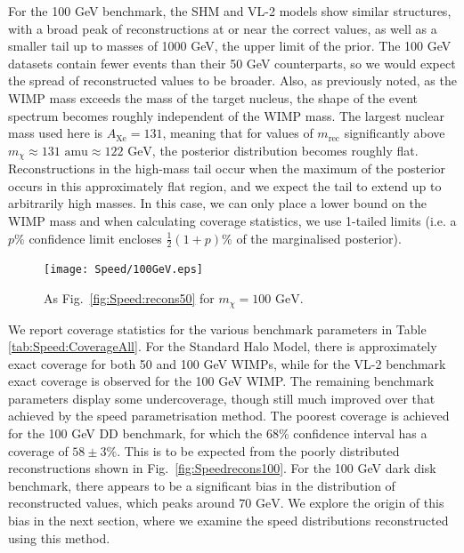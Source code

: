 For the 100 GeV benchmark, the SHM and VL-2 models show similar structures, with a broad peak of reconstructions at or near the correct values, as well as a smaller tail up to masses of 1000 GeV, the upper limit of the prior. The 100 GeV datasets contain fewer events than their 50 GeV counterparts, so we would expect the spread of reconstructed values to be broader. Also, as previously noted, as the WIMP mass exceeds the mass of the target nucleus, the shape of the event spectrum becomes roughly independent of the WIMP mass. The largest nuclear mass used here is \(A_\textrm{Xe} = 131\), meaning that for values of \(m_\textrm{rec}\) significantly above \(m_\chi \approx 131 \textrm{ amu} \approx 122 \textrm{ GeV}\), the posterior distribution becomes roughly flat. Reconstructions in the high-mass tail occur when the maximum of the posterior occurs in this approximately flat region, and we expect the tail to extend up to arbitrarily high masses. In this case, we can only place a lower bound on the WIMP mass and when calculating coverage statistics, we use 1-tailed limits (i.e. a \(p\%\) confidence limit encloses \(\frac{1}{2}(1+p) \%\) of the marginalised posterior).

 \begin{figure}[t]
\centering
\texttt{[image: Speed/100GeV.eps]}
\caption[Distribution of reconstructed masses using the binned momentum distribution for a 100 GeV WIMP with SHM, SHM+DD and VL2 distribution functions]{As Fig.\ \ref{fig:Speed:recons50} for \(m_\chi = 100 \textrm{ GeV}\).}
  \label{fig:Speed:recons100}
\end{figure}



We report coverage statistics for the various benchmark parameters in Table \ref{tab:Speed:CoverageAll}. For the Standard Halo Model, there is approximately exact coverage for both 50 and 100 GeV WIMPs, while for the VL-2 benchmark exact coverage is observed for the 100 GeV WIMP. The remaining benchmark parameters display some undercoverage, though still much improved over that achieved by the speed parametrisation method. The poorest coverage is achieved for the 100 GeV DD benchmark, for which the 68\% confidence interval has a coverage of \(58 \pm 3 \%\). This is to be expected from the poorly distributed reconstructions shown in Fig.\ \ref{fig:Speedrecons100}. For the 100 GeV dark disk benchmark, there appears to be a significant bias in the distribution of reconstructed values, which peaks around \(70 \textrm{ GeV}\). We explore the origin of this bias in the next section, where we examine the speed distributions reconstructed using this method.

